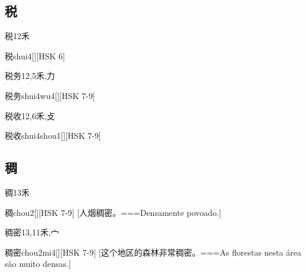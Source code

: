 \subsection*{税}

\begin{Entry}{税}{12}{⽲}
  \begin{Phonetics}{税}{shui4}[][HSK 6]
  \end{Phonetics}
\end{Entry}

\begin{Entry}{税务}{12,5}{⽲,⼒}
  \begin{Phonetics}{税务}{shui4wu4}[][HSK 7-9]
  \end{Phonetics}
\end{Entry}

\begin{Entry}{税收}{12,6}{⽲,⽁}
  \begin{Phonetics}{税收}{shui4shou1}[][HSK 7-9]
  \end{Phonetics}
\end{Entry}

\subsection*{稠}

\begin{Entry}{稠}{13}{⽲}
  \begin{Phonetics}{稠}{chou2}[][HSK 7-9]
    [人烟稠密。===Densamente povoado.]
  \end{Phonetics}
\end{Entry}

\begin{Entry}{稠密}{13,11}{⽲,⼧}
  \begin{Phonetics}{稠密}{chou2mi4}[][HSK 7-9]
    [这个地区的森林非常稠密。===As florestas nesta área são muito densas.]
  \end{Phonetics}
\end{Entry}


